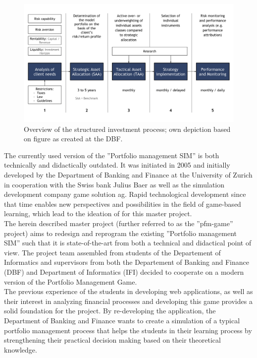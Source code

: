 \begin{figure}[h!]
  \centering
  \includegraphics[scale=0.6]{img/private_banking_process.png}
  \caption{Overview of the structured investment process; own depiction based on figure as created at the DBF.}
  \label{fig:investment_process}
\end{figure}

The currently used version of the ''Portfolio management SIM'' is both technically and didactically outdated. It was initiated in 2005 and initially developed by the Department of Banking and Finance at the University of Zurich in cooperation with the Swiss bank Julius Baer as well as the simulation development company game solution ag. Rapid technological development since that time enables new perspectives and possibilities in the field of game-based learning, which lead to the ideation of for this master project. \\


The herein described master project (further referred to as the ''pfm-game'' project) aims to redesign and reprogram the existing ''Portfolio management SIM'' such that it is state-of-the-art from both a technical and didactical point of view. The project team assembled from students of the Departement of Informatics and supervisors from both the Departement of Banking and Finance (DBF) and Department of Informatics (IFI) decided to cooperate on a modern version of the Portfolio Management Game. \\

The previous experience of the students in developing web applications, as well as their interest in analyzing financial processes and developing this game provides a solid foundation for the project. By re-developing the application, the Department of Banking and Finance wants to create a simulation of a typical portfolio management process that helps the students in their learning process by strengthening their practical decision making based on their theoretical knowledge. \\

